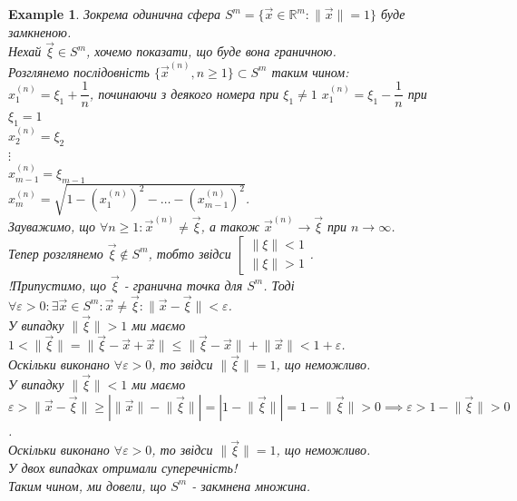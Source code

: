 \documentclass[a4paper, 10pt]{article}
\theoremstyle{theoremdd}
\theoremstyle{theoremdd}
\theoremstyle{theoremdd}
\theoremstyle{theoremdd}
\theoremstyle{theoremdd}
\newtheorem{example}[theorem]{Example}
\theoremstyle{theoremdd}
\theoremstyle{theoremdd}
\theoremstyle{theoremdd}
\theoremstyle{theoremdd}
\newcommand\Norm[1]{\lVert#1\rVert}
\begin{document}
\begin{example}
Зокрема одинична сфера $S^m = \{ \vec{x} \in \mathbb{R}^m: \Norm{\vec{x}} = 1 \}$ буде замкненою.\\
Нехай $\vec{\xi} \in S^m$, хочемо показати, що буде вона граничною. \\
Розглянемо послідовність $\{ \vec{x}^{(n)}, n \geq 1 \} \subset S^m$ таким чином:\\
$x_1^{(n)} = \xi_1 + \dfrac{1}{n}$, починаючи з деякого номера при $\xi_1 \neq 1$ \hspace{2cm} $x_1^{(n)} = \xi_1 - \dfrac{1}{n}$ при $\xi_1 = 1$\\
$x_2^{(n)} = \xi_2$\\
$\vdots$\\
$x_{m-1}^{(n)} = \xi_{m-1}$\\
$x_m^{(n)} = \sqrt{1-\left(x_1^{(n)}\right)^2 - \dots - \left(x_{m-1}^{(n)}\right)^2}$.\\
Зауважимо, що $\forall n \geq 1: \vec{x}^{(n)} \neq \vec{\xi}$, а також $\vec{x}^{(n)} \to \vec{\xi}$ при $n \to \infty$.\\
Тепер розглянемо $\vec{\xi} \not\in S^m$, тобто звідси $\left[\begin{gathered} \Norm{\xi} < 1 \\ \Norm{\xi} > 1 \end{gathered} \right.$.\\
!Припустимо, що $\vec{\xi}$ - гранична точка для $S^m$. Тоді $\forall \varepsilon > 0: \exists \vec{x} \in S^m: \vec{x} \neq \vec{\xi}: \Norm{\vec{x}-\vec{\xi}} < \varepsilon$.\\
У випадку $\Norm{\vec{\xi}} > 1$ ми маємо 
$1 < \Norm{\vec{\xi}} = \Norm{\vec{\xi} - \vec{x} + \vec{x}} \leq \Norm{\vec{\xi} - \vec{x}} + \Norm{\vec{x}} < 1 + \varepsilon$.\\
Оскільки виконано $\forall \varepsilon > 0$, то звідси $\Norm{\vec{\xi}} = 1$, що неможливо.\\
У випадку $\Norm{\vec{\xi}} < 1$ ми маємо $\varepsilon > \Norm{\vec{x} - \vec{\xi}} \geq | \Norm{\vec{x}} - \Norm{\vec{\xi}} | = | 1 - \Norm{\vec{\xi}} | = 1 - \Norm{\vec{\xi}} > 0 \implies \varepsilon > 1 - \Norm{\vec{\xi}} > 0$.\\
Оскільки виконано $\forall \varepsilon > 0$, то звідси $\Norm{\vec{\xi}} = 1$, що неможливо.\\
У двох випадках отримали суперечність!\\
Таким чином, ми довели, що $S^m$ - закмнена множина.
\end{example}
\end{document}
